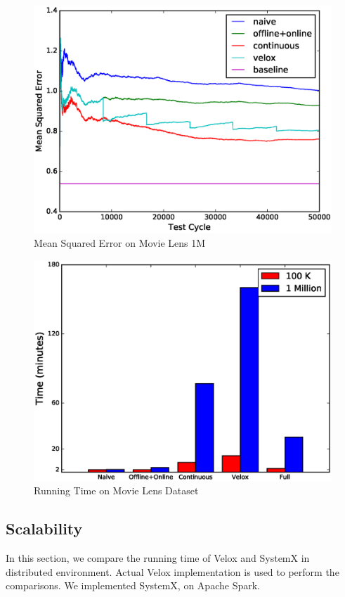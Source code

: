 \documentclass{sig-alternate-05-2015}
\begin{document}
\begin{figure}[!ht]
\centering
\includegraphics[width=\columnwidth]{../images/experiment-results/movie-lens-1m-quality.eps}
\caption{Mean Squared Error on Movie Lens 1M}
\label{fig:movie-lens-1M-score}
\end{figure}


\begin{figure}[!ht]
\centering
\includegraphics[width=\columnwidth]{../images/experiment-results/movie-lens-time.eps}
\caption{Running Time on Movie Lens Dataset}
\label{fig:movie-lens-running-time}
\end{figure}

\subsection{Scalability}
In this section, we compare the running time of Velox and SystemX in distributed environment.
Actual Velox implementation is used to perform the comparisons.
We implemented SystemX, on Apache Spark.
\end{document}
